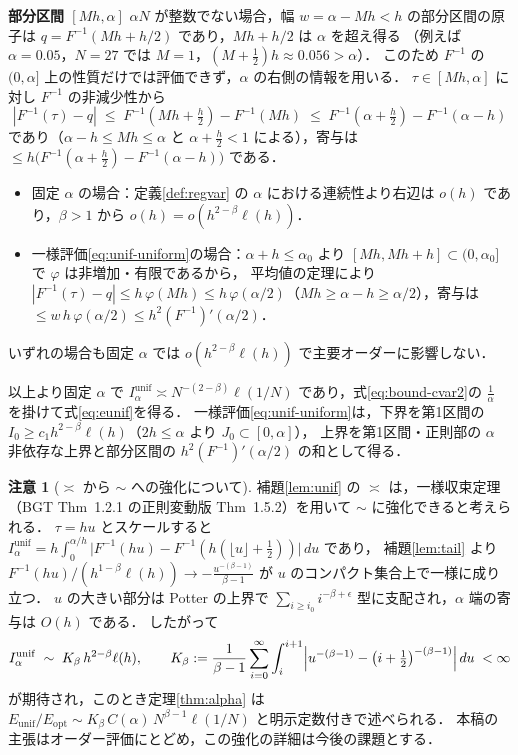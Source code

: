 \documentclass[a4paper,10pt]{jsarticle}
\makeatletter
\theoremstyle{definition}
\newtheorem{remark}{注意}[section]
\renewenvironment{proof}[1][\proofname]{\par
  \pushQED{\qed}%
  \normalfont \topsep6\p@\@plus6\p@\relax
  \trivlist
  \item[\hskip\labelsep\textbf{#1}]\ignorespaces
}{%
  \popQED\endtrivlist\@endpefalse
}
\renewcommand{\proofname}{証明}
\newcommand{\Finv}{F^{-1}}
\newcommand{\Eunif}{E_{\mathrm{unif}}}
\newcommand{\Eopt}{E_{\mathrm{opt}}}
\newcommand{\Iunif}{I_\alpha^{\mathrm{unif}}}
\makeatother
\begin{document}
\begin{proof}
\noindent\textbf{部分区間 $[Mh,\alpha]$}
$\alpha N$ が整数でない場合，幅 $w=\alpha-Mh<h$ の部分区間の原子は $q=\Finv(Mh+h/2)$ であり，$Mh+h/2$ は $\alpha$ を超え得る
（例えば $\alpha=0.05$，$N=27$ では $M=1$，$(M+\frac12)h\approx0.056>\alpha$）．
このため $\Finv$ の $(0,\alpha]$ 上の性質だけでは評価できず，$\alpha$ の右側の情報を用いる．
$\tau\in[Mh,\alpha]$ に対し $\Finv$ の非減少性から
\begin{equation*}
 |\Finv(\tau)-q|\;\le\;\Finv(Mh+\tfrac h2)-\Finv(Mh)\;\le\;\Finv(\alpha+\tfrac h2)-\Finv(\alpha-h)
\end{equation*}
であり（$\alpha-h\le Mh\le\alpha$ と $\alpha+\frac h2<1$ による），寄与は $\le h\bigl(\Finv(\alpha+\frac h2)-\Finv(\alpha-h)\bigr)$ である．
\begin{itemize}
\item 固定 $\alpha$ の場合：定義\ref{def:regvar} の $\alpha$ における連続性より右辺は $o(h)$ であり，$\beta>1$ から $o(h)=o(h^{2-\beta}\ell(h))$．
\item 一様評価\eqref{eq:unif-uniform}の場合：$\alpha+h\le\alpha_0$ より $[Mh,Mh+h]\subset(0,\alpha_0]$ で $\varphi$ は非増加・有限であるから，
 平均値の定理により $|\Finv(\tau)-q|\le h\,\varphi(Mh)\le h\,\varphi(\alpha/2)$（$Mh\ge\alpha-h\ge\alpha/2$），寄与は $\le w\,h\,\varphi(\alpha/2)\le h^2(\Finv)'(\alpha/2)$．
\end{itemize}
いずれの場合も固定 $\alpha$ では $o(h^{2-\beta}\ell(h))$ で主要オーダーに影響しない．

以上より固定 $\alpha$ で $\Iunif\asymp N^{-(2-\beta)}\ell(1/N)$ であり，式\eqref{eq:bound-cvar2}の $\frac1\alpha$ を掛けて式\eqref{eq:eunif}を得る．
一様評価\eqref{eq:unif-uniform}は，下界を第1区間の $I_0\ge c_1h^{2-\beta}\ell(h)$（$2h\le\alpha$ より $J_0\subset[0,\alpha]$），
上界を第1区間・正則部の $\alpha$ 非依存な上界と部分区間の $h^2(\Finv)'(\alpha/2)$ の和として得る．
\end{proof}

\begin{remark}[$\asymp$ から $\sim$ への強化について]
\label{rem:sharp}
補題\ref{lem:unif} の $\asymp$ は，一様収束定理（BGT Thm~1.2.1 の正則変動版 Thm~1.5.2）を用いて $\sim$ に強化できると考えられる．
$\tau=hu$ とスケールすると $\Iunif=h\int_0^{\alpha/h}\bigl|\Finv(hu)-\Finv(h(\lfloor u\rfloor+\frac12))\bigr|\,du$ であり，
補題\ref{lem:tail} より $\Finv(hu)/(h^{1-\beta}\ell(h))\to-\frac{u^{-(\beta-1)}}{\beta-1}$ が $u$ のコンパクト集合上で一様に成り立つ．
$u$ の大きい部分は Potter の上界で $\sum_{i\ge i_0}i^{-\beta+\epsilon}$ 型に支配され，$\alpha$ 端の寄与は $O(h)$ である．
したがって
\begin{equation*}
 \Iunif\;\sim\;K_\beta\,h^{2-\beta}\ell(h),\qquad
 K_\beta:=\frac1{\beta-1}\sum_{i=0}^{\infty}\int_i^{i+1}\Bigl|u^{-(\beta-1)}-\bigl(i+\tfrac12\bigr)^{-(\beta-1)}\Bigr|\,du\;<\infty
\end{equation*}
が期待され，このとき定理\ref{thm:alpha} は $\Eunif/\Eopt\sim K_\beta\,C(\alpha)\,N^{\beta-1}\ell(1/N)$ と明示定数付きで述べられる．
本稿の主張はオーダー評価にとどめ，この強化の詳細は今後の課題とする．
\end{remark}
\end{document}
